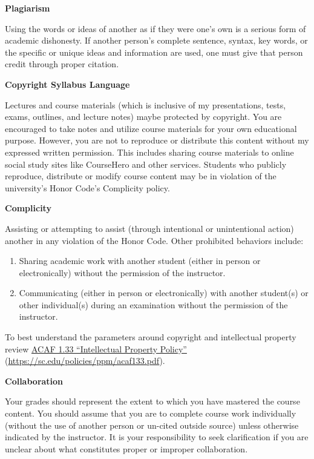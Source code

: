 \documentclass[11pt,letterpaper]{article}
\begin{document}
{\bfseries Plagiarism} \par
Using the words or ideas of another as if they were one's own is a serious form of academic dishonesty. If another person’s complete sentence, syntax, key words, or the specific or unique ideas and information are used, one must give that person credit through proper citation. \par\vspace{0.3cm}

{\bfseries Copyright Syllabus Language} \par
Lectures and course materials (which is inclusive of my presentations, tests, exams, outlines, and lecture notes) maybe protected by copyright. You are encouraged to take notes and utilize course materials for your own educational purpose. However, you are not to reproduce or distribute this content without my expressed written permission. This includes sharing course materials to online social study sites like CourseHero and other services. Students who publicly reproduce, distribute or modify course content may be in violation of the university's Honor Code’s Complicity policy. \par\vspace{0.3cm}

{\bfseries Complicity} \par
Assisting or attempting to assist (through intentional or unintentional action) another in any violation of the Honor Code. Other prohibited behaviors include:
	\begin{enumerate}[1.]
	\item Sharing academic work with another student (either in person or electronically) without the permission of the instructor.
	\item Communicating (either in person or electronically) with another student(s) or other individual(s) during an examination without the permission of the instructor.
	\end{enumerate}
To best understand the parameters around copyright and intellectual property review \href{https://sc.edu/policies/ppm/acaf133.pdf}{ACAF 1.33 ``Intellectual Property Policy''} (\url{https://sc.edu/policies/ppm/acaf133.pdf}). \par\vspace{0.3cm}

{\bfseries Collaboration} \par
Your grades should represent the extent to which you have mastered the course content. You should assume that you are to complete course work individually (without the use of another person or un-cited outside source) unless otherwise indicated by the instructor. It is your responsibility to seek clarification if you are unclear about what constitutes proper or improper collaboration. \par\vspace{0.3cm}
\end{document}
